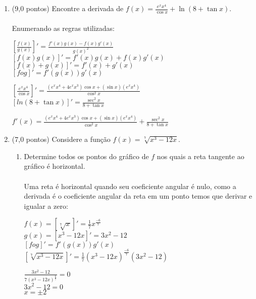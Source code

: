 \documentclass[12pt]{article}
\begin{document}
\begin{enumerate}
	
	\item (9,0 pontos) Encontre a derivada de $ f(x) = \frac{e^x x^4}{\cos{x}} + \ln{(8+\tan{x})} $.\\
	\\
	Enumerando as regras utilizadas:
	\begin{center}
		$ \left[\frac{f(x)}{g(x)}\right]' = \frac{f'(x)g(x) - f(x)g'(x)}{g(x)^2} $\\
		$ \left[f(x)g(x)\right]' = f'(x)g(x) + f(x)g'(x) $\\
		$ \left[f(x)+g(x)\right]' = f'(x) + g'(x) $\\
		$ [fog]' = f'(g(x))g'(x) $\\
	\end{center}
	
	\begin{center}
		$ \left[\frac{e^x x^4}{\cos{x}}\right]' = \frac{(e^x x^4 + 4e^x x^3)\cos x + (\sin x)(e^x x^4)}{\cos^{2}x} $\\
		$ \left[ ln{(8+\tan{x})} \right]' = \frac{\sec^{2}x}{8 + \tan x} $\\
	\end{center}
	
	\begin{center}
		$ f'(x) = \frac{(e^x x^4 + 4e^x x^3)\cos x + (\sin x)(e^x x^4)}{\cos^{2}x} + \frac{\sec^{2}x}{8 + \tan x} $\\
	\end{center}
	
	
	
	\item (7,0 pontos) Considere a função $ f(x) = \sqrt[7]{x^3 - 12x} $.
	\begin{enumerate}
		\item Determine todos os pontos do gráfico de $f$ nos quais a reta tangente ao gráfico é horizontal.\\
		\\
		Uma reta é horizontal quando seu coeficiente angular é nulo, como a derivada é o coeficiente angular da reta em um ponto temos que derivar e igualar a zero:
		
		\begin{center}
			$ f(x) = \left[\sqrt[7]{x}\right]' = \frac{1}{7}x^{\frac{-6}{7}} $\\
			$ g(x) = \left[x^3 - 12x\right]' = 3x^2 - 12 $\\
			$ [fog]' = f'(g(x))g'(x) $\\
			$ \left[\sqrt[7]{x^3 - 12x}\right]' = \frac{1}{7}(x^3 - 12x)^{\frac{-6}{7}}(3x^2 - 12)  $\\
		\end{center}
		\begin{center}
			$ \frac{3x^2 - 12}{7(x^3 - 12x)^{\frac{6}{7}}} = 0  $\\
			$ 3x^2 - 12 = 0  $\\
			$ x = \pm 2  $\\
		\end{center}
		

\end{enumerate}
\end{enumerate}
\end{document}
